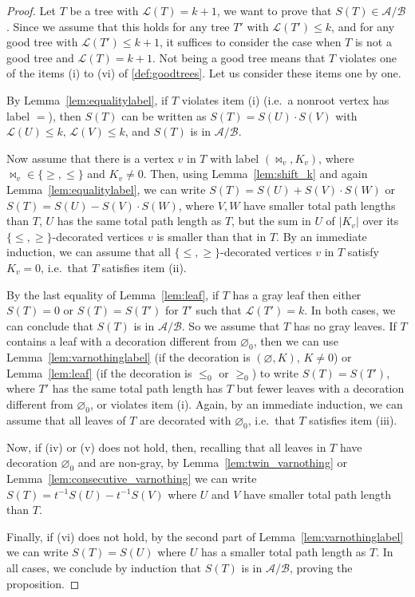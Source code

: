 \documentclass[12pt]{amsart}
\theoremstyle{plain}
\theoremstyle{remark}
\def\cL{\mathcal{L}}
\def\cA{\mathcal{A}}
\def\cB{\mathcal{B}}
\begin{document}
\begin{proof}
Let $T$ be a tree with $\cL(T) = k+1$, we want to prove that $S(T) \in  \cA/\cB$.
Since we assume that this holds for any tree $T'$ with $\cL(T') \le k$, and for any good tree with $\cL(T') \le k+1$, it suffices to consider the case when $T$ is not a good tree and $\cL(T) = k+1$. Not being a good tree means that $T$ violates one of the items (i) to (vi) of \cref{def:goodtrees}. Let us consider these items one by one.

By Lemma~\ref{lem:equalitylabel}, if $T$ violates item (i) (i.e.~a nonroot vertex has label $=$), then $S(T)$ can be written as $S(T)=S(U)\cdot S(V)$ with $\cL(U) \leq k, \, \cL(V) \leq k$, and $S(T)$ is in $\cA/\cB$.

Now assume that there is a vertex $v$ in $T$ with label $(\bowtie_v,K_v)$, where $\bowtie_v \in \{ \geq, \leq \}$ and $K_v \neq 0$. Then, using Lemma~\ref{lem:shift_k} and again Lemma~\ref{lem:equalitylabel}, we can write $S(T) = S(U) + S(V) \cdot S(W)$ or $S(T)=S(U)-S(V) \cdot S(W)$, where $V,W$ have smaller total path lengths than $T$,
$U$ has the same total path length as $T$,
but the sum in $U$ of $|K_v|$
over its $\{\le,\ge\}$-decorated vertices $v$ is smaller than that in $T$.
By an immediate induction, we can assume that all $\{\le,\ge\}$-decorated vertices $v$ in $T$ satisfy $K_v=0$, i.e.~that $T$ satisfies item (ii).

By the last equality of Lemma~\ref{lem:leaf}, if $T$ has a gray leaf then either $S(T)=0$ or $S(T)=S(T')$ for $T'$ such that $\cL(T')=k$. 
In both cases, we can conclude that $S(T)$ is in $\cA/\cB$.
So we assume that $T$ has no gray leaves. If $T$ contains a leaf with a decoration different from $\varnothing_0$,
then we can use Lemma~\ref{lem:varnothinglabel} (if the decoration is $(\varnothing,K)$, $K\ne 0$) or Lemma~\ref{lem:leaf} (if the decoration is $\le_0$ or $\ge_0$)
to write $S(T)=S(T')$, where $T'$
has the same total path length has $T$ but fewer leaves with a decoration different from $\varnothing_0$, or violates item (i). Again, by an immediate induction,
we can assume that all leaves of $T$ are decorated with $\varnothing_0$,
i.e.~that $T$ satisfies item (iii).

Now, if (iv) or (v) does not hold, then, recalling that all leaves in $T$ have decoration $\varnothing_0$ and are non-gray,
by Lemma~\ref{lem:twin_varnothing} or Lemma~\ref{lem:consecutive_varnothing} we can write $S(T)=t^{-1}S(U)-t^{-1}S(V)$ 
where $U$ and $V$ have smaller total path length than $T$.

Finally, if (vi) does not hold, by the second part of Lemma~\ref{lem:varnothinglabel} we can write $S(T)=S(U)$ where $U$ has a smaller total path length as $T$.
In all cases, we conclude by induction that $S(T)$ is in $\cA/\cB$,
proving the proposition.
\end{proof}
\end{document}
